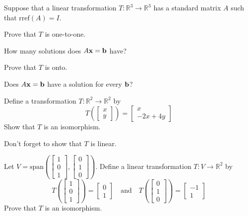 \documentclass{ximera}
\renewcommand{\vec}[1]{{\bf #1}}
\newcommand{\RR}{\mathbb{R}}
\begin{document}
 \begin{problem}
 Suppose that a linear transformation $T:\RR^3\rightarrow \RR^3$ has a standard matrix $A$ such that $\text{rref}(A)=I$.
 
 Prove that $T$ is one-to-one.
 \begin{hint}
 How many solutions does $A\vec{x}=\vec{b}$ have?
 \end{hint}
 Prove that $T$ is onto.
 \begin{hint}
 Does $A\vec{x}=\vec{b}$ have a solution for every $\vec{b}$?
 \end{hint}
 \end{problem}
 
 \begin{problem}
 Define a transformation $T:\RR^2\rightarrow \RR^2$ by 
 $$T\left(\begin{bmatrix}x\\y\end{bmatrix}\right)=\begin{bmatrix}x\\-2x+4y\end{bmatrix}$$
 Show that $T$ is an isomorphism.
 \begin{hint}
 Don't forget to show that $T$ is linear.
 \end{hint}
 \end{problem}
 
 \begin{problem}
 Let $V=\text{span}\left(\begin{bmatrix}1\\0\\1\end{bmatrix}, \begin{bmatrix}0\\1\\0\end{bmatrix}\right)$.  Define a linear transformation $T:V\rightarrow \RR^2$ by
 $$T\left(\begin{bmatrix}1\\0\\1\end{bmatrix}\right)=\begin{bmatrix}0\\1\end{bmatrix}\quad \text{and}\quad T\left(\begin{bmatrix}0\\1\\0\end{bmatrix}\right)=\begin{bmatrix}-1\\1\end{bmatrix}$$
 Prove that $T$ is an isomorphism.
 \end{problem}
\end{document}
